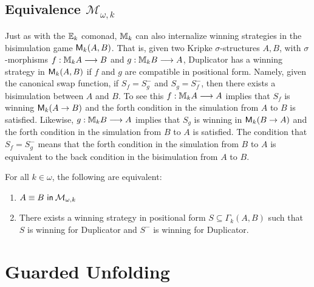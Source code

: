 \subsection{Equivalence $\mathcal{M}_{\omega,k}$}
Just as with the ${\mathbb{E}_{k}}$ comonad, ${\mathbb{M}_{k}}$ can also internalize winning strategies in the bisimulation game ${\mathsf{M}_{k}(A,B)}$. That is, given two Kripke $\sigma$-structures $A,B$, with $\sigma$-morphisms $f:{\mathbb{M}_{k}A} \longrightarrow B$ and $g:{\mathbb{M}_{k}B} \longrightarrow A$, Duplicator has a winning strategy in ${\mathsf{M}_{k}(A,B)}$ if $f$ and $g$ are compatible in positional form. Namely, given the canonical swap function, if $S_{f} = S_{g}^{-}$ and $S_{g} = S_{f}^{-}$, then there exists a bisimulation between $A$ and $B$. To see this $f:{\mathbb{M}_{k}A} \longrightarrow A$ implies that $S_{f}$ is winning ${\mathsf{M}_{k}(A \rightarrow B)}$ and the forth condition in the simulation from $A$ to $B$ is satisfied. Likewise, $g:{\mathbb{M}_{k}B} \longrightarrow A$ implies that $S_{g}$ is winning in ${\mathsf{M}_{k}(B \rightarrow A)}$ and the forth condition in the simulation from $B$ to $A$ is satisfied. The condition that $S_{f} = S_{g}^{-}$ means that the forth condition in the simulation from $B$ to $A$ is equivalent to the back condition in the bisimulation from $A$ to $B$. 
\begin{prop}
For all $k \in \omega$, the following are equivalent:
\begin{enumerate}[label=(\arabic*)$_{k}$]
\item ${A \equiv B \ \mathsf{in}\: \mathcal{M}_{\omega,k}}$ 
\item There exists a winning strategy in positional form $S \subseteq \Gamma_{k}(A,B)$ such that $S$ is winning for Duplicator and $S
^{-}$ is winning for Duplicator. 
\end{enumerate}
\end{prop}
\section{Guarded Unfolding}
